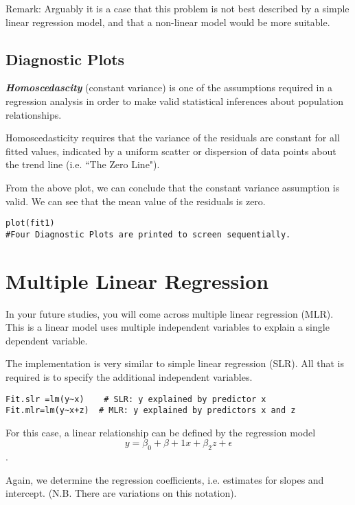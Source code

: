 \documentclass[a4paper,12pt]{article}
\begin{document}
Remark: Arguably it is a case that this problem is not best described by a simple linear regression model, and that a non-linear model would be more suitable.

\subsection{Diagnostic Plots}
\textbf{\emph{Homoscedascity }}(constant variance) is one of the assumptions required in a regression analysis in order to make valid statistical inferences about population relationships.

Homoscedasticity requires that the variance of the residuals are constant for all fitted values, indicated by a uniform scatter or dispersion of data points about the trend line (i.e. ``The Zero Line").

From the above plot, we can conclude that the constant variance assumption is valid. We can see that the mean value of the residuals is zero.
\begin{framed}
\begin{verbatim}
plot(fit1)
#Four Diagnostic Plots are printed to screen sequentially.
\end{verbatim}
\end{framed}
\newpage
\section{Multiple Linear Regression}
In your future studies, you will come across multiple linear regression (MLR). This is a linear model uses multiple independent variables to explain a single dependent variable.

The implementation is very similar to simple linear regression (SLR). All that is required is to specify the additional independent variables.

\begin{framed}
\begin{verbatim}
Fit.slr =lm(y~x)  	# SLR: y explained by predictor x
Fit.mlr=lm(y~x+z)  # MLR: y explained by predictors x and z
\end{verbatim}
\end{framed}

For this case, a  linear relationship can be defined by the regression model  \[y =\beta_0 + \beta+1x + \beta_2z + \epsilon\].

Again, we determine the regression coefficients, i.e. estimates for slopes and intercept. (N.B. There are variations on this notation).
\end{document}

